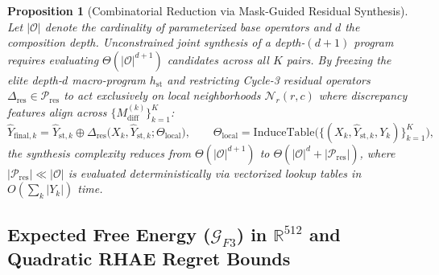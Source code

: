 \documentclass[10pt,a4paper]{article}
\newtheorem{proposition}{Proposition}
\begin{document}
\begin{proposition}[Combinatorial Reduction via Mask-Guided Residual Synthesis]
\label{prop:residual_decomp}
Let $|\mathcal{O}|$ denote the cardinality of parameterized base operators and $d$ the composition depth. Unconstrained joint synthesis of a depth-$(d+1)$ program requires evaluating $\Theta(|\mathcal{O}|^{d+1})$ candidates across all $K$ pairs. By freezing the elite depth-$d$ macro-program $h_{\text{st}}$ and restricting Cycle-3 residual operators $\Delta_{\text{res}} \in \mathcal{P}_{\text{res}}$ to act exclusively on local neighborhoods $\mathcal{N}_r(r,c)$ where discrepancy features align across $\{M_{\text{diff}}^{(k)}\}_{k=1}^K$:
\begin{equation}
\hat{Y}_{\text{final},k} = \hat{Y}_{\text{st},k} \oplus \Delta_{\text{res}}\big(X_k, \hat{Y}_{\text{st},k}; \Theta_{\text{local}}\big), \qquad \Theta_{\text{local}} = \text{InduceTable}\Big(\big\{(X_k, \hat{Y}_{\text{st},k}, Y_k)\big\}_{k=1}^K\Big),
\end{equation}
the synthesis complexity reduces from $\Theta(|\mathcal{O}|^{d+1})$ to $\Theta(|\mathcal{O}|^d + |\mathcal{P}_{\text{res}}|)$, where $|\mathcal{P}_{\text{res}}| \ll |\mathcal{O}|$ is evaluated deterministically via vectorized lookup tables in $O(\sum_k |Y_k|)$ time.
\end{proposition}

\subsection{Expected Free Energy ($\mathcal{G}_{F3}$) in $\mathbb{R}^{512}$ and Quadratic RHAE Regret Bounds}
\end{document}
